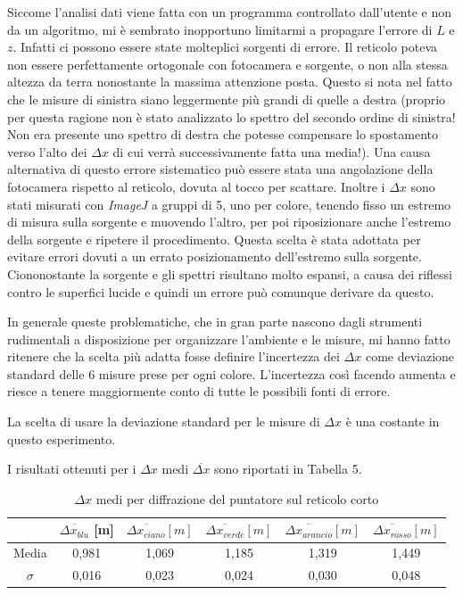 \documentclass{article}
\begin{document}
Siccome l'analisi dati viene fatta con un programma controllato dall'utente e non da un algoritmo, mi è sembrato inopportuno limitarmi a propagare l'errore di $L$ e $z$. Infatti ci possono essere state molteplici sorgenti di errore. Il reticolo poteva non essere perfettamente ortogonale con fotocamera e sorgente, o non alla stessa altezza da terra nonostante la massima attenzione posta. Questo si nota nel fatto che le misure di sinistra siano leggermente più grandi di quelle a destra (proprio per questa ragione non è stato analizzato lo spettro del secondo ordine di sinistra! Non era presente uno spettro di destra che potesse compensare lo spostamento verso l'alto dei $\Delta x$ di cui verrà successivamente fatta una media!). Una causa alternativa di questo errore sistematico può essere stata una angolazione della fotocamera rispetto al reticolo, dovuta al tocco per scattare. Inoltre i $\Delta x$ sono stati misurati con \textit{ImageJ} a gruppi di 5, uno per colore, tenendo fisso un estremo di misura sulla sorgente e muovendo l'altro, per poi riposizionare anche l'estremo della sorgente e ripetere il procedimento. Questa scelta è stata adottata per evitare errori dovuti a un errato posizionamento dell'estremo sulla sorgente. Ciononostante la sorgente e gli spettri risultano molto espansi, a causa dei riflessi contro le superfici lucide e quindi un errore può comunque derivare da questo.

\vspace{3mm}

In generale queste problematiche, che in gran parte nascono dagli strumenti rudimentali a disposizione per organizzare l'ambiente e le misure, mi hanno fatto ritenere che la scelta più adatta fosse definire l'incertezza dei $\Delta x$ come deviazione standard delle 6 misure prese per ogni colore. L'incertezza così facendo aumenta e riesce a tenere maggiormente conto di tutte le possibili fonti di errore.

\vspace{3mm}

La scelta di usare la deviazione standard per le misure di $\Delta x$ è una costante in questo esperimento.

\vspace{3mm}

I risultati ottenuti per i $\Delta x$  medi $\overline{\Delta x}$ sono riportati in Tabella 5.

\begin{table}[h]
    \centering
\begin{tabular}{||c|c|c|c|c|c||}
    \hline
     & \cellcolor{blue}$\overline{\Delta x_{blu}}$ [m] & \cellcolor{cyan}$\overline{\Delta x_{ciano}} [m]$ & \cellcolor{green}$\overline{\Delta x_{verde}}[m]$ & \cellcolor{orange}$\overline{\Delta x_{arancio}}[m]$ & \cellcolor{red}$\overline{\Delta x_{rosso}}[m]$ \\
    \hline
    Media & 0,981 & 1,069 & 1,185 & 1,319 & 1,449 \\
    $\sigma$ & 0,016 & 0,023 & 0,024 & 0,030 & 0,048\\
    \hline
\end{tabular}
\caption{$\Delta x$ medi per diffrazione del puntatore sul reticolo corto}
\end{table}
\end{document}
